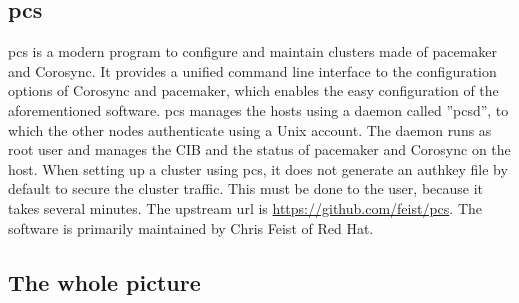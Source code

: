 \subsection{pcs}
\ac{pcs} is a modern program to configure and maintain clusters made of pacemaker and Corosync. It provides a unified command line interface to the configuration options of Corosync and pacemaker, which enables the easy configuration of the aforementioned software. pcs manages
the hosts using a daemon called ''pcsd'', to which the other nodes authenticate using a Unix account.
The daemon runs as root user and manages the \ac{CIB} and the status of pacemaker and Corosync on the host.
When setting up a cluster using pcs, it does not generate an authkey file by default to secure the
cluster traffic. This must be done to the user, because it takes several minutes.
The upstream url is \url{https://github.com/feist/pcs}. The software is primarily maintained by Chris Feist of Red Hat.

\subsection{The whole picture}
